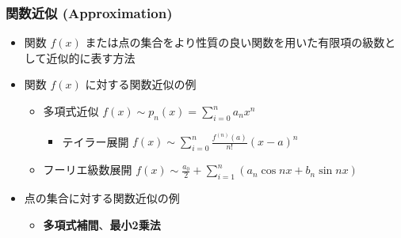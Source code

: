 \documentclass[dvipdfmx,aspectratio=169,20pt]{beamer}
\newcommand{\myfontsetting}[3]{{\fontsize{#1}{#2}\selectfont #3}}
\begin{document}
\begin{frame}
\frametitle{関数近似 {\small (Approximation)}}
\begin{itemize}
    \setlength{\itemsep}{0.25cm}
    \item \myfontsetting{18pt}{18pt}{関数 $f(x)$ または点の集合をより性質の良い関数を用いた有限項の級数として近似的に表す方法}
    \item \myfontsetting{18pt}{18pt}{関数 $f(x)$ に対する関数近似の例}
    \setlength{\itemsep}{0.15cm}
    \begin{itemize}
        \item \myfontsetting{15pt}{15pt}{多項式近似} \myfontsetting{12pt}{12pt}{$f(x) \sim p_n(x)=\sum_{i=0}^n a_n x^n$}
        \begin{itemize}
            \setlength{\itemsep}{0.15cm}
            \item テイラー展開 \myfontsetting{10pt}{10pt}{ $f(x) \sim \sum_{i=0}^n \frac{f^{(n)}(a)}{n!}(x-a)^n$}
        \end{itemize}
        \item \myfontsetting{15pt}{15pt}{ フーリエ級数展開} \myfontsetting{12pt}{12pt}{ $f(x)\sim \frac{a_0}{2}+\sum_{i=1}^n \left( a_n \cos nx + b_n \sin nx\right)$}
    \end{itemize}
    \item \myfontsetting{18pt}{18pt}{点の集合に対する関数近似の例}
    \begin{itemize}
        \item \myfontsetting{15pt}{15pt}{\bf 多項式補間}、\myfontsetting{15pt}{15pt}{\bf 最小2乗法}
    \end{itemize}
\end{itemize}
\end{frame}
\end{document}
